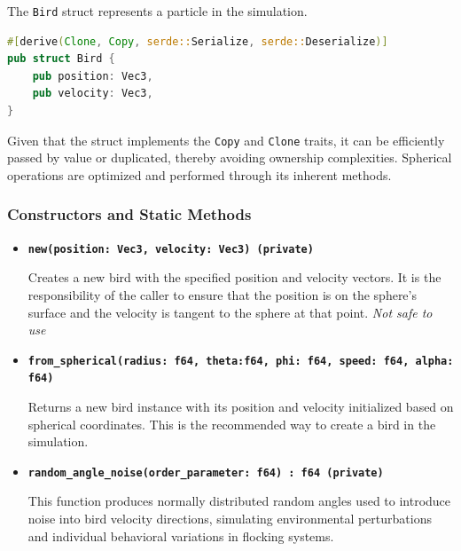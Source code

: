 \documentclass[12pt,a4paper]{article}
\begin{document}
The \texttt{Bird} struct represents a particle in the simulation.
\begin{lstlisting}[language=rust, caption={\texttt{Bird} struct}, label={lst:bird_struct}]
#[derive(Clone, Copy, serde::Serialize, serde::Deserialize)]
pub struct Bird { 
    pub position: Vec3,
    pub velocity: Vec3,
}
\end{lstlisting}
Given that the struct implements the \texttt{Copy} and \texttt{Clone} traits, it can be efficiently passed by value or duplicated, thereby avoiding ownership complexities. Spherical operations are optimized and performed through its inherent methods.
\subsubsection{Constructors and Static Methods}
\begin{itemize}
    \item \textbf{\texttt{new(position: Vec3, velocity: Vec3)  (private)}} 
    
    Creates a new bird with the specified position and velocity vectors. It is the responsibility of the caller to ensure that the position is on the sphere's surface and the velocity is tangent to the sphere at that point. \emph{Not safe to use}

    \item \textbf{\texttt{from\_spherical(radius: f64, theta:f64, phi: f64, speed: f64, alpha: f64)}}

    Returns a new bird instance with its position and velocity initialized based on spherical coordinates. This is the recommended way to create a bird in the simulation.

    \item \textbf{\texttt{random\_angle\_noise(order\_parameter: f64) : f64  (private)}}
    
    This function produces normally distributed random angles used to introduce noise into bird velocity directions, simulating environmental perturbations and individual behavioral variations in flocking systems.
\end{itemize}
\end{document}
